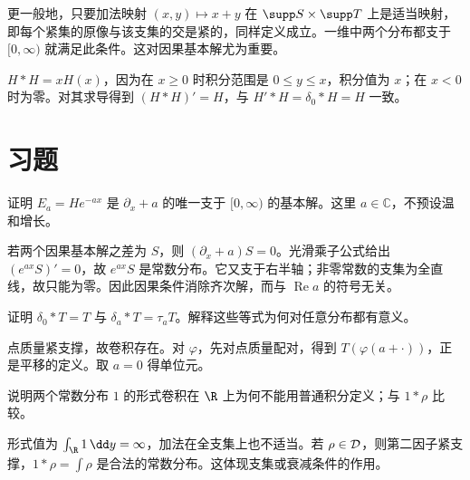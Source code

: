 更一般地，只要加法映射 $(x,y)\mapsto x+y$ 在 $\supp S\times\supp T$ 上是适当映射，即每个紧集的原像与该支集的交是紧的，同样定义成立。一维中两个分布都支于 $[0,\infty)$ 就满足此条件。这对因果基本解尤为重要。
\begin{example}[半轴上的因果卷积]
$H*H=xH(x)$，因为在 $x\ge0$ 时积分范围是 $0\le y\le x$，积分值为 $x$；在 $x<0$ 时为零。对其求导得到 $(H*H)'=H$，与 $H'*H=\delta_0*H=H$ 一致。
\end{example}

\section{习题}
\begin{exercise}[因果基本解的唯一性]
证明 $E_a=He^{-ax}$ 是 $\partial_x+a$ 的唯一支于 $[0,\infty)$ 的基本解。这里 $a\in\mathbb C$，不预设温和增长。
\end{exercise}
\begin{solution}
若两个因果基本解之差为 $S$，则 $(\partial_x+a)S=0$。光滑乘子公式给出 $(e^{ax}S)'=0$，故 $e^{ax}S$ 是常数分布。它又支于右半轴；非零常数的支集为全直线，故只能为零。因此因果条件消除齐次解，而与 $\operatorname{Re}a$ 的符号无关。
\end{solution}
\begin{exercise}[卷积单位]
证明 $\delta_0*T=T$ 与 $\delta_a*T=\tau_aT$。解释这些等式为何对任意分布都有意义。
\end{exercise}
\begin{solution}
点质量紧支撑，故卷积存在。对 $\varphi$，先对点质量配对，得到 $T(\varphi(a+\cdot))$，正是平移的定义。取 $a=0$ 得单位元。
\end{solution}
\begin{exercise}[常数卷积的障碍]
说明两个常数分布 $1$ 的形式卷积在 $\R$ 上为何不能用普通积分定义；与 $1*\rho$ 比较。
\end{exercise}
\begin{solution}
形式值为 $\int_\R1\,\dd y=\infty$，加法在全支集上也不适当。若 $\rho\in\mathcal{D}$，则第二因子紧支撑，$1*\rho=\int\rho$ 是合法的常数分布。这体现支集或衰减条件的作用。
\end{solution}
